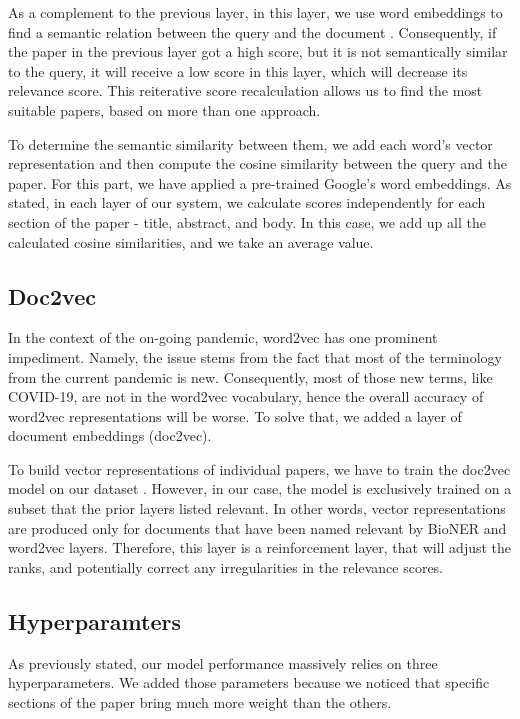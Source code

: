 \documentclass[10pt, a4paper]{article}
\begin{document}
	As a complement to the previous layer, in this layer, we use word embeddings to find a semantic relation between the query and the document \cite{mikolov2013distributed}. Consequently, if the paper in the previous layer got a high score, but it is not semantically similar to the query, it will receive a low score in this layer, which will decrease its relevance score. This reiterative score recalculation allows us to find the most suitable papers, based on more than one approach.
	
	To determine the semantic similarity between them, we add each word's vector representation and then compute the cosine similarity between the query and the paper. For this part, we have applied a pre-trained Google's word embeddings. As stated, in each layer of our system, we calculate scores independently for each section of the paper - title, abstract, and body. In this case, we add up all the calculated cosine similarities, and we take an average value. 
	
	\subsection{Doc2vec}
	
In the context of the on-going pandemic, word2vec has one prominent impediment. Namely, the issue stems from the fact that most of the terminology from the current pandemic is new. Consequently, most of those new terms, like COVID-19, are not in the word2vec vocabulary, hence the overall accuracy of word2vec representations will be worse. To solve that, we added a layer of document embeddings (doc2vec). 

To build vector representations of individual papers, we have to train the doc2vec model on our dataset \cite{le2014distributed}. However, in our case, the model is exclusively trained on a subset that the prior layers listed relevant. In other words, vector representations are produced only for documents that have been named relevant by BioNER and word2vec layers. Therefore, this layer is a reinforcement layer, that will adjust the ranks, and potentially correct any irregularities in the relevance scores.

\subsection{Hyperparamters}

As previously stated, our model performance massively relies on three hyperparameters. We added those parameters because we noticed that specific sections of the paper bring much more weight than the others. 
\end{document}
